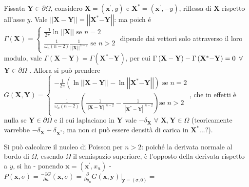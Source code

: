 \documentclass{article}
\begin{document}
Fissata $\mathbf{Y}\in \partial \Omega $, considero $\mathbf{X}=\left( 
\mathbf{x}^{\prime },y\right) $ e $\mathbf{X}^{\ast }=\left( \mathbf{x}%
^{\prime },-y\right) $, riflessa di $\mathbf{X}$ rispetto all'asse $y$. Vale 
$\left\vert \left\vert \mathbf{X-Y}\right\vert \right\vert =\left\vert
\left\vert \mathbf{X}^{\ast }\mathbf{-Y}\right\vert \right\vert $: ma poich%
\'{e} $\Gamma \left( \mathbf{X}\right) =\left\{ 
\begin{array}{c}
\frac{-1}{2\pi }\ln \left\vert \left\vert \mathbf{X}\right\vert \right\vert 
\text{ se }n=2 \\ 
\frac{1}{\omega _{n}\left( n-2\right) }\frac{1}{\left\vert \left\vert 
\mathbf{X}\right\vert \right\vert ^{n-2}}\text{ se }n>2%
\end{array}%
\right. $ dipende dai vettori solo attraverso il loro modulo, vale $\Gamma
\left( \mathbf{X-Y}\right) =\Gamma \left( \mathbf{X}^{\ast }\mathbf{-Y}%
\right) $, per cui $\Gamma \left( \mathbf{X-Y}\right) -\Gamma \left( \mathbf{%
X}^{\ast }\mathbf{-Y}\right) =0$ $\forall $ $\mathbf{Y}\in \partial \Omega $%
. Allora si pu\`{o} prendere $G\left( \mathbf{X,Y}\right) =\left\{ 
\begin{array}{c}
-\frac{1}{2\pi }\left( \ln \left\vert \left\vert \mathbf{X-Y}\right\vert
\right\vert -\ln \left\vert \left\vert \mathbf{X}^{\ast }\mathbf{-Y}%
\right\vert \right\vert \right) \text{ se }n=2 \\ 
\frac{1}{\omega _{n}\left( n-2\right) }\left( \frac{1}{\left\vert \left\vert 
\mathbf{X-Y}\right\vert \right\vert ^{n-2}}-\frac{1}{\left\vert \left\vert 
\mathbf{X}^{\ast }-\mathbf{Y}\right\vert \right\vert ^{n-2}}\right) \text{
se }n>2%
\end{array}%
\right. $, che in effetti \`{e} nulla se $\mathbf{Y}\in \partial \Omega $ e
il cui laplaciano in $\mathbf{Y}$ vale $-\delta _{\mathbf{X}}$ $\forall $ $%
\mathbf{X,Y}\in \Omega $ (teoricamente varrebbe $-\delta _{\mathbf{X}%
}+\delta _{\mathbf{X}^{\ast }}$, ma non ci pu\`{o} essere densit\`{a} di
carica in $\mathbf{X}^{\ast }$...?).

Si pu\`{o} calcolare il nucleo di Poisson per $n>2$: poich\'{e} la derivata
normale al bordo di $\Omega $, essendo $\Omega $ il semispazio superiore, 
\`{e} l'opposto della derivata rispetto a $y$, si ha - ponendo $\mathbf{x}%
=\left( \mathbf{x}^{\prime },x_{n}\right) $ - $P\left( \mathbf{x},\sigma
\right) =\frac{-\partial G}{\partial n}\left( \mathbf{x},\sigma \right) =%
\frac{\partial }{\partial y_{n}}G\left( \mathbf{x,y}\right) |_{\mathbf{y}%
=\left( \sigma ,0\right) }=$
\end{document}
